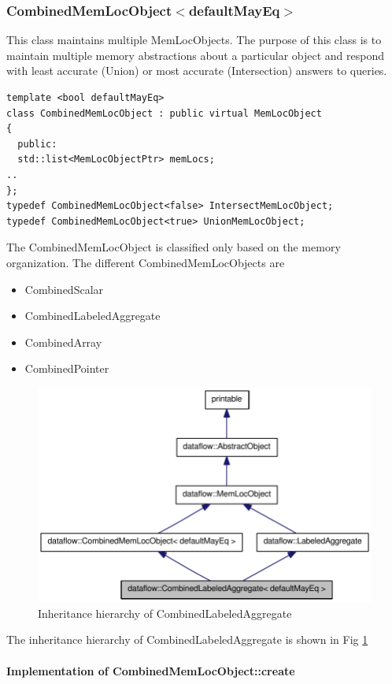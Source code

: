 \documentclass{article}
\begin{document}
\subsubsection{CombinedMemLocObject$<$defaultMayEq$>$}
This class maintains multiple MemLocObjects. The purpose of this class
is to maintain multiple memory abstractions about a particular object
and respond with least accurate (Union) or most accurate
(Intersection) answers to queries.
\begin{lstlisting}
template <bool defaultMayEq>
class CombinedMemLocObject : public virtual MemLocObject
{
  public:
  std::list<MemLocObjectPtr> memLocs;
..
};
typedef CombinedMemLocObject<false> IntersectMemLocObject;
typedef CombinedMemLocObject<true> UnionMemLocObject;
\end{lstlisting}
The CombinedMemLocObject is classified only based on the memory
organization. The different CombinedMemLocObjects are
\begin{itemize}
\item CombinedScalar
\item CombinedLabeledAggregate
\item CombinedArray
\item CombinedPointer
\end{itemize}
\begin{figure}[htb]
\includegraphics{cla-inherit-graph.pdf}
\caption{Inheritance hierarchy of CombinedLabeledAggregate}
\label{fig:cla_inherit_graph}
\end{figure}
The inheritance hierarchy of CombinedLabeledAggregate is shown in Fig \ref{fig:cla_inherit_graph}
\paragraph{Implementation of CombinedMemLocObject::create}
\end{document}
